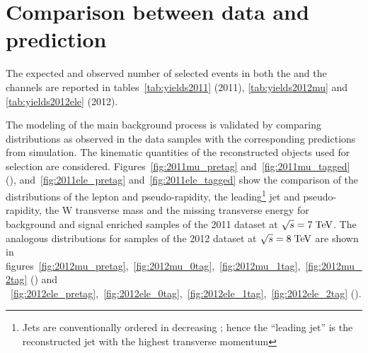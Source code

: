 \section{Comparison between data and prediction}
\label{sec:datamc}

The expected and observed number of selected events in both the \mujets{} and
the \ejets{} channels are reported in tables~\ref{tab:yields2011}
(2011), \ref{tab:yields2012mu} and \ref{tab:yields2012ele} (2012).



The modeling of the main background process is validated by comparing
distributions as observed in the data samples with the corresponding
predictions from simulation. The kinematic quantities of the reconstructed
objects used for selection are
considered. Figures~\ref{fig:2011mu_pretag}
and~\ref{fig:2011mu_tagged} (\mujets{}), and~\ref{fig:2011ele_pretag}
and~\ref{fig:2011ele_tagged} show the comparison of the distributions
of the lepton \pt{} and pseudo-rapidity, the leading\footnote{Jets are
conventionally ordered in decreasing \pt{}; hence the ``leading jet''
is the reconstructed jet with the highest transverse momentum} jet
\pt{} and pseudo-rapidity, the W transverse mass and the missing
transverse energy for background and signal enriched samples of the
2011 dataset at $\sqrt{s} = 7 \; \mathrm{TeV}{}$. The analogous distributions for
samples of the 2012 dataset at $\sqrt{s} = 8 \; \mathrm{TeV}{}$ are shown in
figures~\ref{fig:2012mu_pretag},~\ref{fig:2012mu_0tag},~\ref{fig:2012mu_1tag},~\ref{fig:2012mu_2tag}
(\mujets{}) and
~\ref{fig:2012ele_pretag},~\ref{fig:2012ele_0tag},~\ref{fig:2012ele_1tag},~\ref{fig:2012ele_2tag} (\ejets{}).

